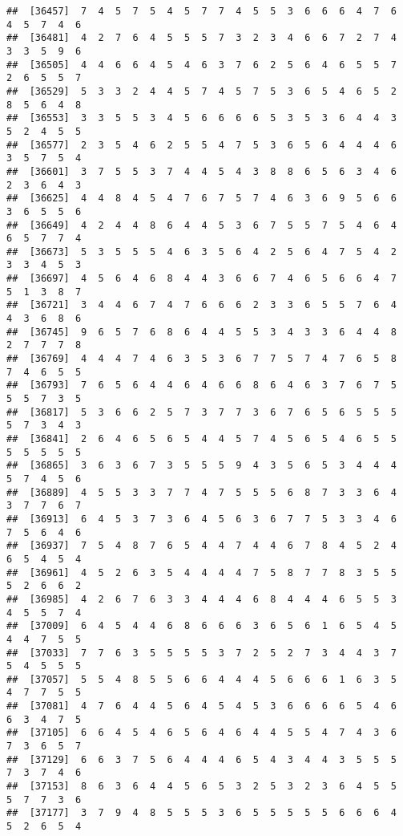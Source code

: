 \documentclass[
]{book}
\begin{document}
\begin{verbatim}
##  [36457]  7  4  5  7  5  4  5  7  7  4  5  5  3  6  6  6  4  7  6  4  5  7  4  6
##  [36481]  4  2  7  6  4  5  5  5  7  3  2  3  4  6  6  7  2  7  4  3  3  5  9  6
##  [36505]  4  4  6  6  4  5  4  6  3  7  6  2  5  6  4  6  5  5  7  2  6  5  5  7
##  [36529]  5  3  3  2  4  4  5  7  4  5  7  5  3  6  5  4  6  5  2  8  5  6  4  8
##  [36553]  3  3  5  5  3  4  5  6  6  6  6  5  3  5  3  6  4  4  3  5  2  4  5  5
##  [36577]  2  3  5  4  6  2  5  5  4  7  5  3  6  5  6  4  4  4  6  3  5  7  5  4
##  [36601]  3  7  5  5  3  7  4  4  5  4  3  8  8  6  5  6  3  4  6  2  3  6  4  3
##  [36625]  4  4  8  4  5  4  7  6  7  5  7  4  6  3  6  9  5  6  6  3  6  5  5  6
##  [36649]  4  2  4  4  8  6  4  4  5  3  6  7  5  5  7  5  4  6  4  6  5  7  7  4
##  [36673]  5  3  5  5  5  4  6  3  5  6  4  2  5  6  4  7  5  4  2  3  3  4  5  3
##  [36697]  4  5  6  4  6  8  4  4  3  6  6  7  4  6  5  6  6  4  7  5  1  3  8  7
##  [36721]  3  4  4  6  7  4  7  6  6  6  2  3  3  6  5  5  7  6  4  4  3  6  8  6
##  [36745]  9  6  5  7  6  8  6  4  4  5  5  3  4  3  3  6  4  4  8  2  7  7  7  8
##  [36769]  4  4  4  7  4  6  3  5  3  6  7  7  5  7  4  7  6  5  8  7  4  6  5  5
##  [36793]  7  6  5  6  4  4  6  4  6  6  8  6  4  6  3  7  6  7  5  5  5  7  3  5
##  [36817]  5  3  6  6  2  5  7  3  7  7  3  6  7  6  5  6  5  5  5  5  7  3  4  3
##  [36841]  2  6  4  6  5  6  5  4  4  5  7  4  5  6  5  4  6  5  5  5  5  5  5  5
##  [36865]  3  6  3  6  7  3  5  5  5  9  4  3  5  6  5  3  4  4  4  5  7  4  5  6
##  [36889]  4  5  5  3  3  7  7  4  7  5  5  5  6  8  7  3  3  6  4  3  7  7  6  7
##  [36913]  6  4  5  3  7  3  6  4  5  6  3  6  7  7  5  3  3  4  6  7  5  6  4  6
##  [36937]  7  5  4  8  7  6  5  4  4  7  4  4  6  7  8  4  5  2  4  6  5  4  5  4
##  [36961]  4  5  2  6  3  5  4  4  4  4  7  5  8  7  7  8  3  5  5  5  2  6  6  2
##  [36985]  4  2  6  7  6  3  3  4  4  4  6  8  4  4  4  6  5  5  3  4  5  5  7  4
##  [37009]  6  4  5  4  4  6  8  6  6  6  3  6  5  6  1  6  5  4  5  4  4  7  5  5
##  [37033]  7  7  6  3  5  5  5  5  3  7  2  5  2  7  3  4  4  3  7  5  4  5  5  5
##  [37057]  5  5  4  8  5  5  6  6  4  4  4  5  6  6  6  1  6  3  5  4  7  7  5  5
##  [37081]  4  7  6  4  4  5  6  4  5  4  5  3  6  6  6  6  5  4  6  6  3  4  7  5
##  [37105]  6  6  4  5  4  6  5  6  4  6  4  4  5  5  4  7  4  3  6  7  3  6  5  7
##  [37129]  6  6  3  7  5  6  4  4  4  6  5  4  3  4  4  3  5  5  5  7  3  7  4  6
##  [37153]  8  6  3  6  4  4  5  6  5  3  2  5  3  2  3  6  4  5  5  5  7  7  3  6
##  [37177]  3  7  9  4  8  5  5  5  3  6  5  5  5  5  5  6  6  6  4  5  2  6  5  4

\end{verbatim}
\end{document}
